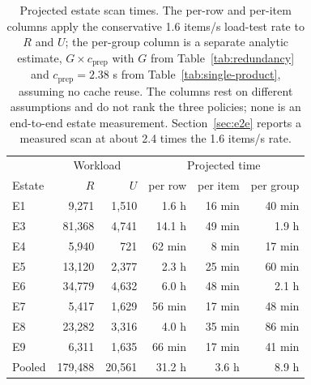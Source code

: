 \begin{table}[htbp]
\centering
\caption{Projected estate scan times. The per-row and per-item columns apply the conservative 1.6 items/s load-test rate to $R$ and $U$; the per-group column is a separate analytic estimate, $G \times c_{\text{prep}}$ with $G$ from Table~\ref{tab:redundancy} and $c_{\text{prep}} = 2.38$ s from Table~\ref{tab:single-product}, assuming no cache reuse. The columns rest on different assumptions and do not rank the three policies; none is an end-to-end estate measurement. Section~\ref{sec:e2e} reports a measured scan at about 2.4 times the 1.6 items/s rate.}
\label{tab:projected}
\footnotesize
\begin{tabular}{l r r r r r}
\hline
 & \multicolumn{2}{c}{Workload} & \multicolumn{3}{c}{Projected time} \\
Estate & $R$ & $U$ & per row & per item & per group \\
\hline
E1 & 9,271 & 1,510 & 1.6 h & 16 min & 40 min \\
E3 & 81,368 & 4,741 & 14.1 h & 49 min & 1.9 h \\
E4 & 5,940 & 721 & 62 min & 8 min & 17 min \\
E5 & 13,120 & 2,377 & 2.3 h & 25 min & 60 min \\
E6 & 34,779 & 4,632 & 6.0 h & 48 min & 2.1 h \\
E7 & 5,417 & 1,629 & 56 min & 17 min & 48 min \\
E8 & 23,282 & 3,316 & 4.0 h & 35 min & 86 min \\
E9 & 6,311 & 1,635 & 66 min & 17 min & 41 min \\
\hline
Pooled & 179,488 & 20,561 & 31.2 h & 3.6 h & 8.9 h \\
\hline
\end{tabular}
\end{table}
